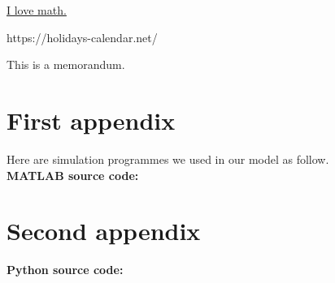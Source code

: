 \documentclass{mcmthesis}  %
\begin{document}
\underline{I love math.}  %

\begin{thebibliography}{99}
         https://holidays-calendar.net/
\end{thebibliography}
\printbibliography  %


\begin{appendices}  %

\begin{memo}[Memorandum]  %
	This is a memorandum.
\end{memo}  %

\section{First appendix}  %

Here are simulation programmes we used in our model as follow.\\
\textbf{MATLAB source code:}
%

\section{Second appendix}  %

\textbf{Python source code:}
%

\end{appendices}  %
\end{document}

